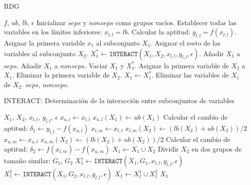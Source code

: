 \begin{algorithm}[H]
\caption{RDG}
\label{alg:RDG}
\begin{algorithmic}[1]
\REQUIRE $f$, $ub$, $lb$, $\epsilon$
\STATE Inicializar $seps$ y $nonseps$ como grupos vacíos.
\STATE Establecer todas las variables en los límites inferiores: $x_{l,l} = lb$.
\STATE Calcular la aptitud: $y_{l,l} = f(x_{l,l})$.
\STATE Asignar la primera variable $x_1$ al subconjunto $X_1$.
\STATE Asignar el resto de las variables al subconjunto $X_2$.
    \STATE $X^*_1 \gets \texttt{INTERACT}(X_1, X_2, x_{l,l}, y_{l,l}, \epsilon)$.
            \STATE Añadir $X_1$ a $seps$.
        \ELSE
            \STATE Añadir $X_1$ a $nonseps$.
        \ENDIF
        \STATE Vaciar $X_1$ y $X^*_1$.
        \STATE Asignar la primera variable de $X_2$ a $X_1$.
        \STATE Eliminar la primera variable de $X_2$.
    \ELSE
        \STATE $X_1 \gets X^*_1$.
        \STATE Eliminar las variables de $X_1$ de $X_2$.
    \ENDIF
\ENDWHILE
\RETURN $seps$, $nonseps$.
\end{algorithmic}
\end{algorithm}

\begin{algorithm}[H]
\caption{INTERACT: Determinación de la interacción entre subconjuntos de variables}
\label{alg:INTERACT}
\begin{algorithmic}[1]
\REQUIRE $X_1$, $X_2$, $x_{l,l}$, $y_{l,l}$, $\epsilon$
\STATE $x_{u,l} \gets x_{l,l}$
\STATE $x_{u,l}(X_1) \gets ub(X_1)$ 
\STATE Calcular el cambio de aptitud: $\delta_1 \gets y_{l,l} - f(x_{u,l})$
\STATE $x_{l,m} \gets x_{l,l}$
\STATE $x_{l,m}(X_2) \gets (lb(X_2) + ub(X_2)) / 2$
\STATE $x_{u,m} \gets x_{u,l}$
\STATE $x_{u,m}(X_2) \gets (lb(X_2) + ub(X_2)) / 2$
\STATE Calcular el cambio de aptitud: $\delta_2 \gets f(x_{l,m}) - f(x_{u,m})$
        \STATE $X_1 \gets X_1 \cup X_2$
    \ELSE
        \STATE Dividir $X_2$ en dos grupos de tamaño similar: $G_1$, $G_2$
        \STATE $X^1_1 \gets \texttt{INTERACT}(X_1, G_1, x_{l,l}, y_{l,l}, \epsilon)$
        \STATE $X^2_1 \gets \texttt{INTERACT}(X_1, G_2, x_{l,l}, y_{l,l}, \epsilon)$
        \STATE $X_1 \gets X^1_1 \cup X^2_1$
    \ENDIF
\ENDIF
\RETURN $X_1$
\end{algorithmic}
\end{algorithm}


